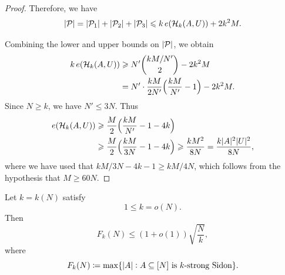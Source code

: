 \documentclass[reqno,a4paper,12pt]{amsart}
\begin{document}
\begin{proof}
    Therefore, we have
    \begin{equation*}
        \card{\cP} = \card{\cP_1} + \card{\cP_2} + \card{\cP_3} \leq k\, e(\cH_k(A,U)) + 2 k^2 M.
    \end{equation*}

    Combining the lower and upper bounds on $\card{\cP}$, we obtain
    \begin{align*}
        k\, e(\cH_k(A,U)) & \geq N' \binom{kM/N'}{2} - 2 k^2 M                               \\
                          & = N' \cdot \frac{kM}{2N'} \p[\Big]{\frac{kM}{N'} - 1} - 2 k^2 M.
    \end{align*}
    Since $N \geq k$, we have $N' \leq 3N$.
    Thus
    \begin{align*}
        e(\cH_k(A,U)) & \geq \frac{M}{2} \p[\Big]{\frac{kM}{N'} - 1 - 4k} \\
                      & \geq \frac{M}{2} \p[\Big]{\frac{kM}{3N} - 1 - 4k}
        \geq \frac{kM^2}{8N} = \frac{k \card{A}^2 \card{U}^2}{8N},
    \end{align*}
    where we have used that $kM/3N - 4k - 1 \geq kM/4N$, which follows from the hypothesis that $M \geq 60 N$.
\end{proof}

\begin{proposition}
    \label{prop:extremal-k-sidon}
    Let \(k=k(N)\) satisfy
    \[
        1\leq k=o(N).
    \]
    Then
    \[
        F_k(N)
        \leq
        (1+o(1))
        \sqrt{\frac Nk},
    \]
    where
    \[
        F_k(N)
        \defined
        \max\set{
            \card{A}:
            A\subseteq[N]
            \text{ is \(k\)-strong Sidon}
        }.
    \]
\end{proposition}
\end{document}
